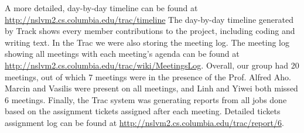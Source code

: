 A more detailed, day-by-day timeline can be found at 
\url{http://nslvm2.cs.columbia.edu/trac/timeline}
The day-by-day timeline generated by Track shows every member contributions
to the project, including coding and writing text. In the Trac we were also
storing the meeting log. The meeting log showing all meetings with each
meeting's agenda can be found at
\url{http://nslvm2.cs.columbia.edu/trac/wiki/MeetingsLog}. Overall, our
group had 20 meetings, out of which 7 meetings were in the presence of the 
Prof. Alfred Aho. Marcin and Vasilis were present on all meetings, and Linh
and Yiwei both missed 6 meetings. Finally, the Trac system was generating
reports from all jobs done based on the assignment tickets assigned after each
meeting. Detailed tickets assignment log can be found at
\url{http://nslvm2.cs.columbia.edu/trac/report/6}.
